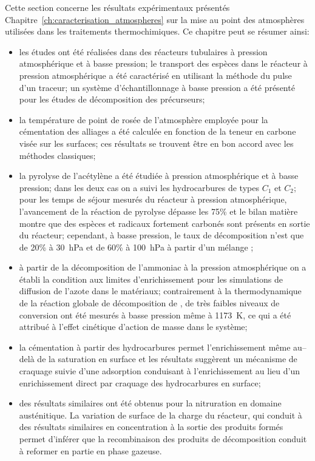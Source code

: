 Cette section concerne les résultats expérimentaux présentés Chapitre~\ref{ch:caracterisation_atmospheres} sur la mise au point des atmosphères utilisées dans les traitements thermochimiques. Ce chapitre peut se résumer ainsi:
\begin{itemize}
  \item les études ont été réalisées dans des réacteurs tubulaires à pression atmosphérique et à basse pression; le transport des espèces dans le réacteur à pression atmosphérique a été caractérisé en utilisant la méthode du pulse d'un traceur; un système d'échantillonnage à basse pression a été présenté pour les études de décomposition des précurseurs;
  
  \item la température de point de rosée de l'atmosphère employée pour la cémentation des alliages a été calculée en fonction de la teneur en carbone visée sur les surfaces; ces résultats se trouvent être en bon accord avec les méthodes classiques;
  
  \item la pyrolyse de l'acétylène a été étudiée à pression atmosphérique et à basse pression; dans les deux cas on a suivi les hydrocarbures de types $C_{1}$ et $C_{2}$; pour les temps de séjour mesurés du réacteur à pression atmosphérique, l'avancement de la réaction de pyrolyse dépasse les 75\% et le bilan matière montre que des espèces et radicaux fortement carbonés sont présents en sortie du réacteur; cependant, à basse pression, le taux de décomposition n'est que de 20\% à \SI{30}{\hecto\pascal} et de 60\% à \SI{100}{\hecto\pascal} à partir d'un mélange ;
  
  \item à partir de la décomposition de l'ammoniac à la pression atmosphérique on a établi la condition aux limites d'enrichissement pour les simulations de diffusion de l'azote dans le matériaux; contrairement à la thermodynamique de la réaction globale de décomposition de , de très faibles niveaux de conversion ont été mesurés à basse pression même à \SI{1173}{\kelvin}, ce qui a été attribué à l'effet cinétique d'action de masse dans le système;
  
  \item la cémentation à partir des hydrocarbures permet l'enrichissement même au--delà de la saturation en surface et les résultats suggèrent un mécanisme de craquage suivie d'une adsorption conduisant à l'enrichissement au lieu d'un enrichissement direct par craquage des hydrocarbures en surface;
  
  \item des résultats similaires ont été obtenus pour la nitruration en domaine austénitique. La variation de surface de la charge du réacteur, qui conduit à des résultats similaires en concentration à la sortie des produits formés permet d'inférer que la recombinaison des produits de décomposition conduit à reformer en partie  en phase gazeuse. 
\end{itemize}

\endinput